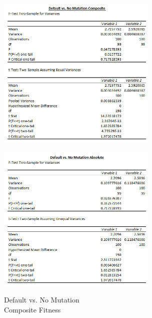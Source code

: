 \documentclass[11pt]{article}
\begin{document}
\begin{figure}[ht]
\centering
\begin{minipage}{.48\textwidth}
  \includegraphics[width=3in]{default_vs_no_comp.png}
  \caption{Default vs. No Mutation \\Composite Fitness}
  \label{fig:default_vs_no_comp}
\end{minipage}\hfill
\begin{minipage}{.48\textwidth}
  \includegraphics[width=3in]{default_vs_no_abs.png}
  \label{fig:default_vs_no_abs}
\end{minipage}
\end{figure}
\end{document}
